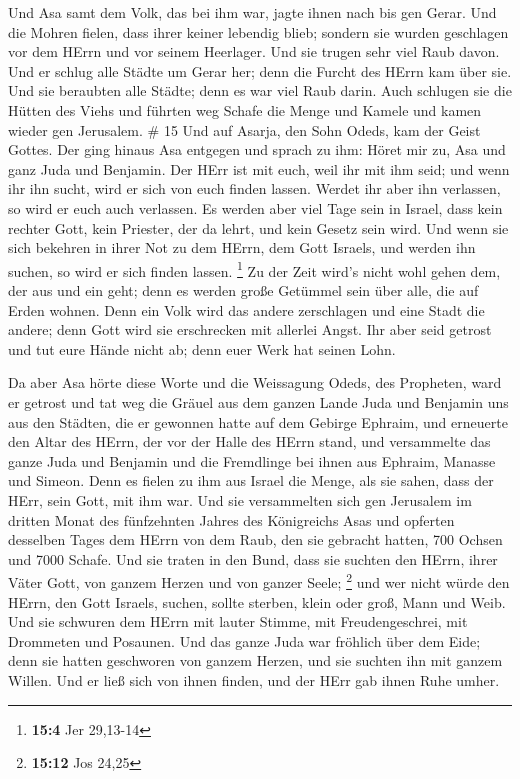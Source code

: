  Und Asa samt dem Volk, das bei ihm war, jagte ihnen nach
bis gen Gerar. Und die Mohren fielen, dass ihrer keiner lebendig blieb;
sondern sie wurden geschlagen vor dem HErrn und vor seinem Heerlager.
Und sie trugen sehr viel Raub davon.  Und er schlug alle
Städte um Gerar her; denn die Furcht des HErrn kam über sie. Und sie
beraubten alle Städte; denn es war viel Raub darin.  Auch
schlugen sie die Hütten des Viehs und führten weg Schafe die Menge und
Kamele und kamen wieder gen Jerusalem. \# 15  Und auf
Asarja, den Sohn Odeds, kam der Geist Gottes.  Der ging
hinaus Asa entgegen und sprach zu ihm: Höret mir zu, Asa und ganz Juda
und Benjamin. Der HErr ist mit euch, weil ihr mit ihm seid; und wenn ihr
ihn sucht, wird er sich von euch finden lassen. Werdet ihr aber ihn
verlassen, so wird er euch auch verlassen.  Es werden aber
viel Tage sein in Israel, dass kein rechter Gott, kein Priester, der da
lehrt, und kein Gesetz sein wird.  Und wenn sie sich
bekehren in ihrer Not zu dem HErrn, dem Gott Israels, und werden ihn
suchen, so wird er sich finden lassen. \footnote{\textbf{15:4} Jer
  29,13-14}  Zu der Zeit wird's nicht wohl gehen dem, der
aus und ein geht; denn es werden große Getümmel sein über alle, die auf
Erden wohnen.  Denn ein Volk wird das andere zerschlagen und
eine Stadt die andere; denn Gott wird sie erschrecken mit allerlei
Angst.  Ihr aber seid getrost und tut eure Hände nicht ab;
denn euer Werk hat seinen Lohn.

 Da aber Asa hörte diese Worte und die Weissagung Odeds, des
Propheten, ward er getrost und tat weg die Gräuel aus dem ganzen Lande
Juda und Benjamin uns aus den Städten, die er gewonnen hatte auf dem
Gebirge Ephraim, und erneuerte den Altar des HErrn, der vor der Halle
des HErrn stand,  und versammelte das ganze Juda und
Benjamin und die Fremdlinge bei ihnen aus Ephraim, Manasse und Simeon.
Denn es fielen zu ihm aus Israel die Menge, als sie sahen, dass der
HErr, sein Gott, mit ihm war.  Und sie versammelten sich
gen Jerusalem im dritten Monat des fünfzehnten Jahres des Königreichs
Asas  und opferten desselben Tages dem HErrn von dem Raub,
den sie gebracht hatten, 700 Ochsen und 7000 Schafe.  Und
sie traten in den Bund, dass sie suchten den HErrn, ihrer Väter Gott,
von ganzem Herzen und von ganzer Seele; \footnote{\textbf{15:12} Jos
  24,25}  und wer nicht würde den HErrn, den Gott Israels,
suchen, sollte sterben, klein oder groß, Mann und Weib. 
Und sie schwuren dem HErrn mit lauter Stimme, mit Freudengeschrei, mit
Drommeten und Posaunen.  Und das ganze Juda war fröhlich
über dem Eide; denn sie hatten geschworen von ganzem Herzen, und sie
suchten ihn mit ganzem Willen. Und er ließ sich von ihnen finden, und
der HErr gab ihnen Ruhe umher.

